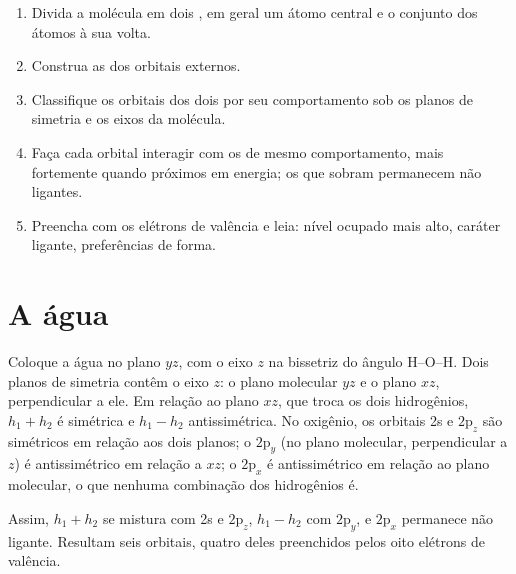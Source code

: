 \begin{method}\label{met:b2:fragment-orbitals:fragment-diagram}
\begin{enumerate}
  \item Divida a molécula em dois , em geral um átomo central e o
        conjunto dos átomos à sua volta.
  \item Construa as  dos orbitais externos.
  \item Classifique os orbitais dos dois  por seu comportamento sob
        os planos de simetria e os eixos da molécula.
  \item Faça cada orbital interagir com os de mesmo comportamento, mais
        fortemente quando próximos em energia; os que sobram permanecem não
        ligantes.
  \item Preencha com os elétrons de valência e leia: nível ocupado mais alto,
        caráter ligante, preferências de forma.
\end{enumerate}
\end{method}

\section{A água}

Coloque a água no plano $yz$, com o eixo $z$ na bissetriz do ângulo H--O--H.
Dois planos de simetria contêm o eixo $z$: o plano molecular $yz$ e o plano
$xz$, perpendicular a ele. Em relação ao plano $xz$, que troca os dois
hidrogênios, $h_1 + h_2$ é simétrica e $h_1 - h_2$ antissimétrica. No oxigênio, os
orbitais 2s e $2\mathrm p_z$ são simétricos em relação aos dois planos; o
$2\mathrm p_y$ (no plano molecular, perpendicular a $z$) é antissimétrico em
relação a $xz$; o $2\mathrm p_x$ é antissimétrico em relação ao plano
molecular, o que nenhuma combinação dos hidrogênios é.

Assim, $h_1 + h_2$ se mistura com 2s e $2\mathrm p_z$, $h_1 - h_2$ com $2\mathrm p_y$, e
$2\mathrm p_x$ permanece não ligante. Resultam seis orbitais, quatro deles
preenchidos pelos oito elétrons de valência.

